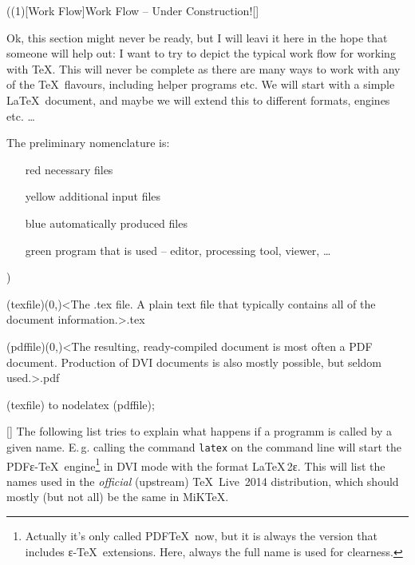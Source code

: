 \newpage
\tograph(\tostruct(1)[Work Flow]{Work Flow – Under Construction!}[\vip]
{
\flushleft
\large Ok, this section might never be ready, but I will leavi it here in the hope that someone will help out: I want to try to depict the typical work flow for working with \TeX. This will never be complete as there are many ways to work with any of the \TeX\ flavours, including helper programs etc. We will start with a simple \LaTeX\ document, and maybe we will extend this to different formats, engines etc. …

The preliminary nomenclature is:
\begin{itemize}
\item[red] necessary files
\item[yellow] additional input files
\item[blue] automatically produced files
\item[green] program that is used – editor, processing tool, viewer, …
\end{itemize}

\let\necessary\vip
\let\additional\experimental
\let\automatic\normalimportant
\let\program\package
}
){
	\tonode(texfile)(0,\layer)<The .tex file. A plain text file that typically contains all of the document information.>{.tex}
	\steplayer[-5]

	\tonode(pdffile)(0,\layer)<The resulting, ready-compiled document is most often a PDF document. Production of DVI documents is also mostly possible, but seldom used.>{.pdf}

	(texfile) to node{latex} (pdffile);
}

\label{sec:text}

\large
{}

\settextviews  %
\onecolumn

[\normalimportant]
\flushleft  %
The following list tries to explain what happens if a programm is called by a given name. E.\,g. calling the command \texttt{latex} on the command line will start the PDFε-\TeX\ engine\footnote{Actually it's only called PDF\TeX\ now, but it is always the version that includes ε-\TeX\ extensions. Here, always the full name is used for clearness.} in DVI mode with the format \LaTeX\,2\raisebox{-.5ex}ε. This will list the names used in the \emph{official} (upstream) \TeX~Live~2014 distribution, which should mostly (but not all) be the same in MiK\TeX.


